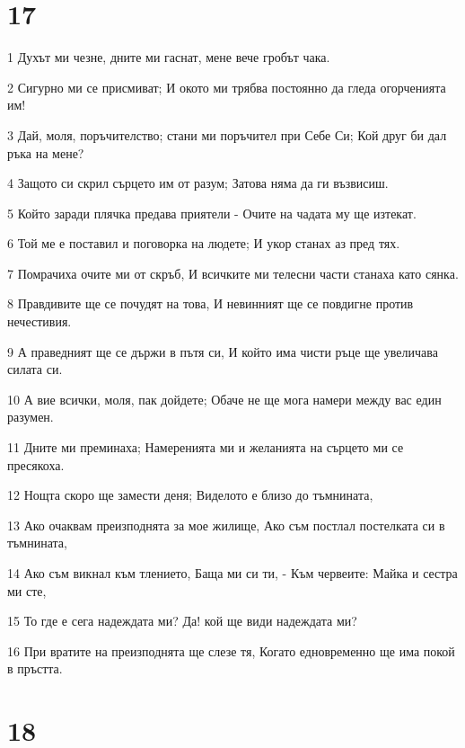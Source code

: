 \chapter{17}

\par 1 Духът ми чезне, дните ми гаснат, мене вече гробът чака.
\par 2 Сигурно ми се присмиват; И окото ми трябва постоянно да гледа огорченията им!
\par 3 Дай, моля, поръчителство; стани ми поръчител при Себе Си; Кой друг би дал ръка на мене?
\par 4 Защото си скрил сърцето им от разум; Затова няма да ги възвисиш.
\par 5 Който заради плячка предава приятели - Очите на чадата му ще изтекат.
\par 6 Той ме е поставил и поговорка на людете; И укор станах аз пред тях.
\par 7 Помрачиха очите ми от скръб, И всичките ми телесни части станаха като сянка.
\par 8 Правдивите ще се почудят на това, И невинният ще се повдигне против нечестивия.
\par 9 А праведният ще се държи в пътя си, И който има чисти ръце ще увеличава силата си.
\par 10 А вие всички, моля, пак дойдете; Обаче не ще мога намери между вас един разумен.
\par 11 Дните ми преминаха; Намеренията ми и желанията на сърцето ми се пресякоха.
\par 12 Нощта скоро ще замести деня; Виделото е близо до тъмнината,
\par 13 Ако очаквам преизподнята за мое жилище, Ако съм постлал постелката си в тъмнината,
\par 14 Ако съм викнал към тлението, Баща ми си ти, - Към червеите: Майка и сестра ми сте,
\par 15 То где е сега надеждата ми? Да! кой ще види надеждата ми?
\par 16 При вратите на преизподнята ще слезе тя, Когато едновременно ще има покой в пръстта.

\chapter{18}

